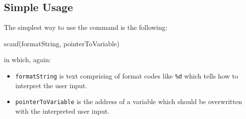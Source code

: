 \subsection{Simple Usage}
The simplest way to use the command is the following:

\begin{codebox}
scanf(formatString, pointerToVariable)
\end{codebox}
in which, again:
\begin{itemize}
\setlength\itemsep{0pt}
\item \texttt{formatString} is text comprising of format codes like \texttt{\%d} which tells how to interpret the user input.
\item \texttt{pointerToVariable} is the address of a variable which should be overwritten with the interpreted user input.
\end{itemize}

